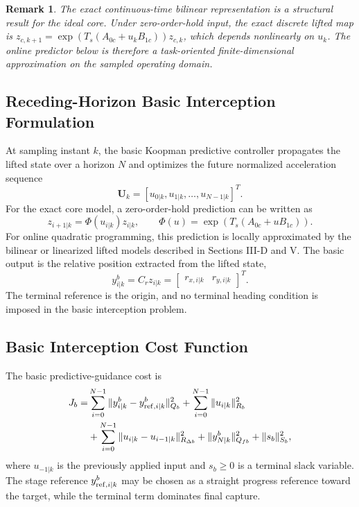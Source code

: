 \documentclass[letterpaper,journal]{IEEEtran}
\newtheorem{remark}{Remark}
\begin{document}
\begin{remark}
The exact continuous-time bilinear representation is a structural result for the ideal core. Under zero-order-hold input, the exact discrete lifted map is $z_{c,k+1}=\exp(T_s(A_{0c}+u_kB_{1c}))z_{c,k}$, which depends nonlinearly on $u_k$. The online predictor below is therefore a task-oriented finite-dimensional approximation on the sampled operating domain.
\end{remark}

\subsection{Receding-Horizon Basic Interception Formulation}
At sampling instant $k$, the basic Koopman predictive controller propagates the lifted state over a horizon $N$ and optimizes the future normalized acceleration sequence
\begin{equation}
    \mathbf U_k=[u_{0|k},u_{1|k},\ldots,u_{N-1|k}]^T .
\end{equation}
For the exact core model, a zero-order-hold prediction can be written as
\begin{equation}
    z_{i+1|k}=\Phi(u_{i|k})z_{i|k},\qquad
    \Phi(u)=\exp(T_s(A_{0c}+uB_{1c})) .
\end{equation}
For online quadratic programming, this prediction is locally approximated by the bilinear or linearized lifted models described in Sections III-D and V. The basic output is the relative position extracted from the lifted state,
\begin{equation}
    y^b_{i|k}=C_r z_{i|k}=
    \begin{bmatrix}r_{x,i|k}&r_{y,i|k}\end{bmatrix}^T .
\end{equation}
The terminal reference is the origin, and no terminal heading condition is imposed in the basic interception problem.

\subsection{Basic Interception Cost Function}
The basic predictive-guidance cost is
\begin{align}
    J_b=&
    \sum_{i=0}^{N-1}
    \|y^b_{i|k}-y^b_{{\rm ref},i|k}\|_{Q_b}^2
    +\sum_{i=0}^{N-1}\|u_{i|k}\|_{R_b}^2 \nonumber\\
    &+\sum_{i=0}^{N-1}\|u_{i|k}-u_{i-1|k}\|_{R_{\Delta b}}^2
    +\|y^b_{N|k}\|_{Q_{fb}}^2
    +\|s_b\|_{S_b}^2 ,
    \label{eq:basic_interception_cost}
\end{align}
where $u_{-1|k}$ is the previously applied input and $s_b\ge0$ is a terminal slack variable. The stage reference $y^b_{{\rm ref},i|k}$ may be chosen as a straight progress reference toward the target, while the terminal term dominates final capture.
\end{document}
